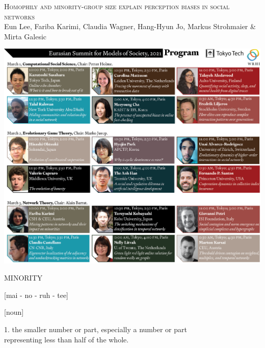 \documentclass{beamer}
\begin{document}
\begin{frame}
    \begin{center}
        \large{\textsc{Homophily and minority-group size explain perception biases in social networks}} \\

        \vspace{1cm}
        \footnotesize{Eun Lee, Fariba Karimi, Claudia Wagner, Hang-Hyun Jo, Markus Strohmaier \& Mirta Galesic}

    \end{center}
\end{frame}

\begin{frame}
    \begin{center}
        \includegraphics[width=\textwidth]{static/eurasian_summit.png}
    \end{center}
\end{frame}

\begin{frame}
    \begin{center}
    \begin{minipage}{.5\textwidth}
        \LARGE{MINORITY}
    \end{minipage}
    \begin{minipage}{.3\textwidth}
        \normalsize{[mai - no - ruh - tee]}
    \end{minipage}
    \vspace{.5cm}

    \hspace{-8cm} \normalsize{[noun]}\\
    \end{center}
    \hspace{.8cm} \normalsize{1. the smaller number or part, especially a number or part} \\
    \hspace{.8cm} \normalsize{representing less than half of the whole.}
\end{frame}
\end{document}
